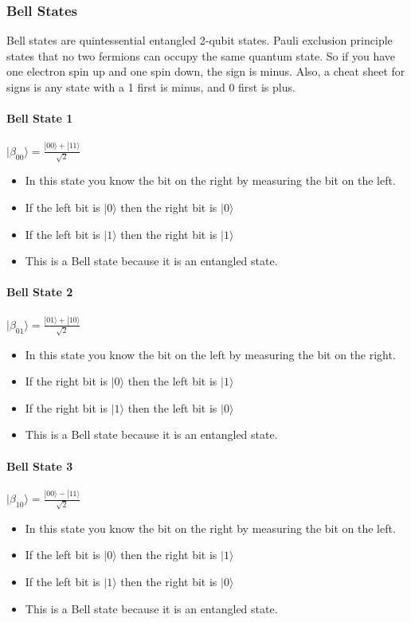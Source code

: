 \documentclass{article}
\begin{document}
\subsubsection{Bell States}
\begin{conceptbox}
Bell states are quintessential entangled 2-qubit states. Pauli exclusion principle states that no two fermions can occupy the same quantum state. So if you have one electron spin up and one spin down, the sign is minus. Also, a cheat sheet for signs is any state with a 1 first is minus, and 0 first is plus.
\end{conceptbox}

\paragraph{Bell State 1} \(|\beta_{00}\rangle = \frac{|00\rangle + |11\rangle}{\sqrt{2}}\)
\begin{itemize}
    \item In this state you know the bit on the right by measuring the bit on the left.
    \item If the left bit is \(|0\rangle\) then the right bit is \(|0\rangle\)
    \item If the left bit is \(|1\rangle\) then the right bit is \(|1\rangle\)
    \item This is a Bell state because it is an entangled state.
\end{itemize}

\paragraph{Bell State 2} \(|\beta_{01}\rangle = \frac{|01\rangle + |10\rangle}{\sqrt{2}}\)
\begin{itemize}
    \item In this state you know the bit on the left by measuring the bit on the right.
    \item If the right bit is \(|0\rangle\) then the left bit is \(|1\rangle\)
    \item If the right bit is \(|1\rangle\) then the left bit is \(|0\rangle\)
    \item This is a Bell state because it is an entangled state.
\end{itemize}

\paragraph{Bell State 3} \(|\beta_{10}\rangle = \frac{|00\rangle - |11\rangle}{\sqrt{2}}\)
\begin{itemize}
    \item In this state you know the bit on the right by measuring the bit on the left.
    \item If the left bit is \(|0\rangle\) then the right bit is \(|1\rangle\)
    \item If the left bit is \(|1\rangle\) then the right bit is \(|0\rangle\)
    \item This is a Bell state because it is an entangled state.
\end{itemize}
\end{document}
